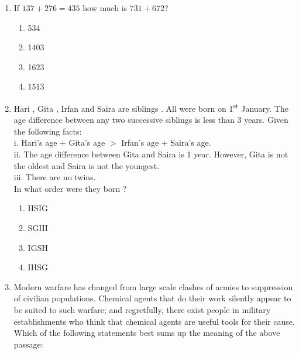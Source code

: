 \documentclass[a4paper,10pt]{article}
\begin{document}
\begin{enumerate}
\begin{multicols}{4}
\begin{enumerate}
\item 50
\item 51
\item 52
\item 54
\end{enumerate}
\end{multicols}

\item If $137 + 276 = 435$ how much is $731 + 672$?
\hfill{}

\begin{multicols}{4}
\begin{enumerate}
\item 534
\item 1403
\item 1623
\item 1513
\end{enumerate}
\end{multicols}

\item Hari , Gita , Irfan  and Saira  are siblings . All were born on 1\textsuperscript{st} January. The age difference between any two successive siblings  is less than 3 years. Given the following facts: \\
i. Hari's age + Gita's age $>$ Irfan's age + Saira's age. \\
ii. The age difference between Gita and Saira is 1 year. However, Gita is not the oldest and Saira is not the youngest. \\
iii. There are no twins. \\
In what order were they born ?
\hfill{}

\begin{multicols}{4}
\begin{enumerate}
\item HSIG
\item SGHI
\item IGSH
\item IHSG
\end{enumerate}
\end{multicols}

\item Modern warfare has changed from large scale clashes of armies to suppression of civilian populations. Chemical agents that do their work silently appear to be suited to such warfare; and regretfully, there exist people in military establishments who think that chemical agents are useful tools for their cause. \\
Which of the following statements best sums up the meaning of the above passage:
\hfill{}


\end{enumerate}
\end{document}

